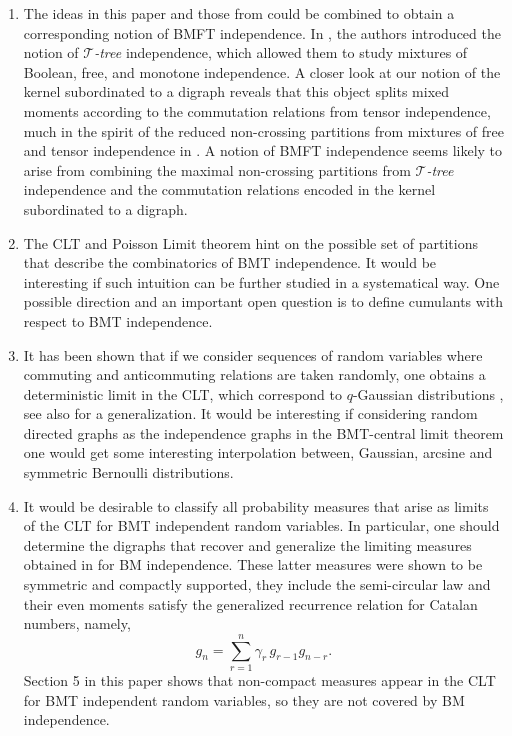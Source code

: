 \documentclass[a4paper,12pt]{extarticle}
\theoremstyle{definition}
\theoremstyle{remark}
\begin{document}
\begin{enumerate}[(1)]
%
\item The ideas in this paper and those from \cite{JW2020} could be combined to obtain a corresponding notion of BMFT independence. 
%
In \cite{JW2020}, the authors introduced the notion of $\mathcal{T}$\emph{-tree} independence, which allowed them to study mixtures of Boolean, free, and monotone independence. 
%
A closer look at our notion of the kernel subordinated to a digraph reveals that this object splits mixed moments according to the commutation relations from tensor independence, much in the spirit of the reduced non-crossing partitions from mixtures of free and tensor independence in \cite{eps2016,Lambda2004}.  
%
A notion of  BMFT independence seems likely to arise from combining the maximal non-crossing partitions from $\mathcal{T}$\emph{-tree} independence and the commutation relations encoded in the kernel subordinated to a digraph. 
%
%
%
%

\item  The CLT and Poisson Limit theorem hint on the possible set of partitions that describe the combinatorics of BMT independence. It would be interesting if such intuition can be further studied in a systematical way. One possible direction and an important open question is to define cumulants with respect to BMT independence.  


 
 	\item It has been shown that if we consider sequences of random variables where  commuting and anticommuting  relations are taken randomly, one obtains a deterministic limit in the CLT, which correspond to $q$-Gaussian distributions \cite{speicher}, see also \cite{blitvic} for a generalization. It would be interesting if considering random directed graphs as the independence graphs in the BMT-central limit theorem one would get some interesting interpolation between, Gaussian, arcsine and symmetric Bernoulli distributions. 


\item It would be desirable to classify all probability measures that arise as limits of the CLT for BMT independent random variables.   
	In particular, one should determine the digraphs that recover and generalize the limiting measures obtained in \cite{BM2010} for BM independence.  
	These latter measures were shown to be symmetric and compactly supported, they include the semi-circular law and their even moments satisfy the generalized recurrence relation for Catalan numbers, namely, 
	\[ g_n = \sum_{r=1}^{n} \gamma_r \, g_{r-1}g_{n-r} . \]
	Section 5 in this paper shows that non-compact measures appear in the CLT for BMT independent random variables, so they are not covered by BM independence. 



\end{enumerate}
\end{document}
